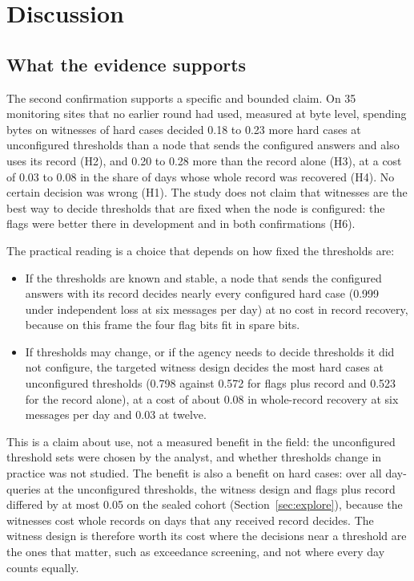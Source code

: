 ﻿\section{Discussion}
\label{sec:discussion}

\subsection{What the evidence supports}
The second confirmation supports a specific and bounded claim. On 35 monitoring sites that no earlier round had used, measured at byte level, spending bytes on witnesses of hard cases decided 0.18 to 0.23 more hard cases at unconfigured thresholds than a node that sends the configured answers and also uses its record (H2), and 0.20 to 0.28 more than the record alone (H3), at a cost of 0.03 to 0.08 in the share of days whose whole record was recovered (H4). No certain decision was wrong (H1). The study does not claim that witnesses are the best way to decide thresholds that are fixed when the node is configured: the flags were better there in development and in both confirmations (H6).

The practical reading is a choice that depends on how fixed the thresholds are:
\begin{itemize}
  \item If the thresholds are known and stable, a node that sends the configured answers with its record decides nearly every configured hard case (0.999 under independent loss at six messages per day) at no cost in record recovery, because on this frame the four flag bits fit in spare bits.
  \item If thresholds may change, or if the agency needs to decide thresholds it did not configure, the targeted witness design decides the most hard cases at unconfigured thresholds (0.798 against 0.572 for flags plus record and 0.523 for the record alone), at a cost of about 0.08 in whole-record recovery at six messages per day and 0.03 at twelve.
\end{itemize}
This is a claim about use, not a measured benefit in the field: the unconfigured threshold sets were chosen by the analyst, and whether thresholds change in practice was not studied. The benefit is also a benefit on hard cases: over all day-queries at the unconfigured thresholds, the witness design and flags plus record differed by at most 0.05 on the sealed cohort (Section~\ref{sec:explore}), because the witnesses cost whole records on days that any received record decides. The witness design is therefore worth its cost where the decisions near a threshold are the ones that matter, such as exceedance screening, and not where every day counts equally.

